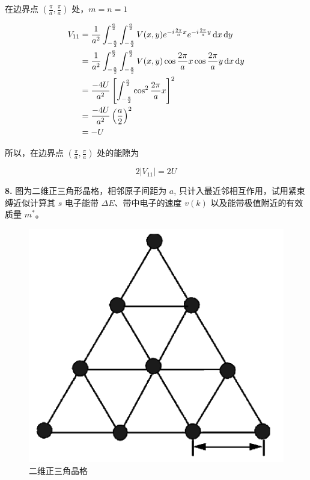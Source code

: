 在边界点 $\left(\frac{\pi}{a}, \frac{\pi}{a}\right)$ 处，$m=n=1$

\begin{align*}
    V_{11} &= \frac{1}{a^2} \int_{-\frac{a}{2}}^{\frac{a}{2}} \int_{-\frac{a}{2}}^{\frac{a}{2}} V(x, y) e^{-i\frac{2\pi}{a}x} e^{-i\frac{2\pi}{a}y} \mathop{}\!\mathrm{d} x \mathop{}\!\mathrm{d} y \\
    &= \frac{1}{a^2} \int_{-\frac{a}{2}}^{\frac{a}{2}} \int_{-\frac{a}{2}}^{\frac{a}{2}} V(x, y) \cos{\frac{2\pi}{a}x} \cos{\frac{2\pi}{a}y} \mathop{}\!\mathrm{d} x \mathop{}\!\mathrm{d} y \\
    &= \frac{-4U}{a^2} \left[\int_{-\frac{a}{2}}^{\frac{a}{2}} \cos^2{\frac{2\pi}{a}x}\right]^2 \\
    &= \frac{-4U}{a^2} \left(\frac{a}{2}\right)^2 \\
    &= -U
\end{align*}

所以，在边界点 $\left(\frac{\pi}{a}, \frac{\pi}{a}\right)$ 处的能隙为

\begin{equation*}
    2|V_{11}| = 2U
\end{equation*}

\noindent \textbf{8.\quad} 图为二维正三角形晶格，相邻原子间距为 $a$, 只计入最近邻相互作用，试用紧束缚近似计算其 $s$ 电子能带 $\Delta E$、带中电子的速度 $v(k)$ 以及能带极值附近的有效质量 $m^*$。

\begin{figure}[htbp]
    \centering
    \includegraphics{pic/二维正三角晶格.png}
    \caption{二维正三角晶格}
    \label{fig:7.2}
\end{figure}

